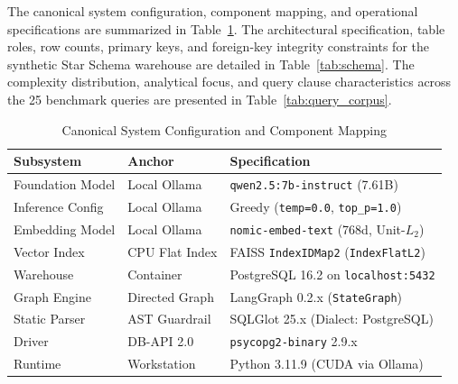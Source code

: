 The canonical system configuration, component mapping, and operational specifications are summarized in Table~\ref{tab:system_config}. The architectural specification, table roles, row counts, primary keys, and foreign-key integrity constraints for the synthetic Star Schema warehouse are detailed in Table~\ref{tab:schema}. The complexity distribution, analytical focus, and query clause characteristics across the 25 benchmark queries are presented in Table~\ref{tab:query_corpus}.

\begin{table}[t]
\centering
\caption{Canonical System Configuration and Component Mapping}
\label{tab:system_config}
\footnotesize
\setlength{\tabcolsep}{2.5pt}
\renewcommand{\arraystretch}{1.04}
\begin{tabularx}{\columnwidth}{@{}p{2.1cm} p{2.1cm} X@{}}
\toprule
\textbf{Subsystem} & \textbf{Anchor} & \textbf{Specification} \\
\midrule
Foundation Model & Local Ollama & \texttt{qwen2.5:7b-instruct} (7.61B) \\
Inference Config & Local Ollama & Greedy (\texttt{temp=0.0}, \texttt{top\_p=1.0}) \\
Embedding Model & Local Ollama & \texttt{nomic-embed-text} (768d, Unit-$L_2$) \\
Vector Index & CPU Flat Index & FAISS \texttt{IndexIDMap2} (\texttt{IndexFlatL2}) \\
Warehouse & Container & PostgreSQL 16.2 on \texttt{localhost:5432} \\
Graph Engine & Directed Graph & LangGraph 0.2.x (\texttt{StateGraph}) \\
Static Parser & AST Guardrail & SQLGlot 25.x (Dialect: PostgreSQL) \\
Driver & DB-API 2.0 & \texttt{psycopg2-binary} 2.9.x \\
Runtime & Workstation & Python 3.11.9 (CUDA via Ollama) \\
\bottomrule
\end{tabularx}
\end{table}

